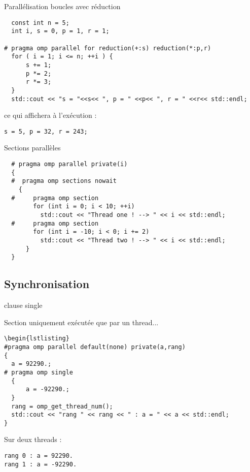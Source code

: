 \documentclass[handout,francais]{beamer}
\begin{document}
\begin{frame}[fragile]{Parallélisation boucles avec réduction}
\begin{lstlisting}
  const int n = 5;
  int i, s = 0, p = 1, r = 1;
  
# pragma omp parallel for reduction(+:s) reduction(*:p,r)
  for ( i = 1; i <= n; ++i ) {
      s += 1;
      p *= 2;
      r *= 3;
  }
  std::cout << "s = "<<s<< ", p = " <<p<< ", r = " <<r<< std::endl;
\end{lstlisting}

ce qui affichera à l'exécution :

\begin{verbatim}
s = 5, p = 32, r = 243;
\end{verbatim}
\end{frame}

\begin{frame}[fragile]{Sections parallèles}
\begin{lstlisting}
  # pragma omp parallel private(i)
  {
  #  pragma omp sections nowait
    {
  #     pragma omp section 
        for (int i = 0; i < 10; ++i)
          std::cout << "Thread one ! --> " << i << std::endl;
  #     pragma omp section
        for (int i = -10; i < 0; i += 2)
          std::cout << "Thread two ! --> " << i << std::endl;
      }
  }
\end{lstlisting}
\end{frame}

\subsection{Synchronisation}

\begin{frame}[fragile]{clause single}
 
Section uniquement exécutée que par un thread...
 
\begin{lstlisting}
\begin{lstlisting}
#pragma omp parallel default(none) private(a,rang)
{
  a = 92290.;
# pragma omp single
  {
      a = -92290.;
  }
  rang = omp_get_thread_num();
  std::cout << "rang " << rang << " : a = " << a << std::endl;
}
\end{lstlisting}

Sur deux threads :
\begin{verbatim}
rang 0 : a = 92290.
rang 1 : a = -92290.
\end{verbatim}
\end{frame}
\end{document}
